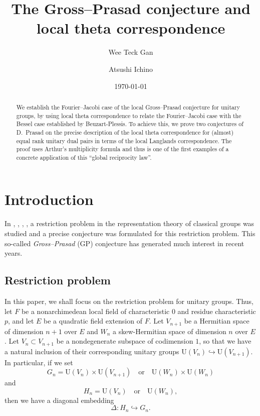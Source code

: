 \documentclass[11pt]{amsart}
\title{The Gross--Prasad conjecture and local theta correspondence}
\author{Wee Teck Gan}
\author{Atsushi Ichino}
\date{\today}
\numberwithin{equation}{section}
\theoremstyle{plain}
\theoremstyle{definition}
\theoremstyle{remark}
\def\U{\mathrm{U}}
\begin{document}
\begin{abstract}
We establish the Fourier--Jacobi case of the local Gross--Prasad conjecture for unitary groups, by using local theta correspondence to relate the Fourier--Jacobi case with the Bessel case established by Beuzart-Plessis.
To achieve this, we prove two conjectures of D.~Prasad on the precise description of the local theta correspondence for (almost) equal rank unitary dual pairs in terms of the local Langlands correspondence.
The proof uses Arthur's multiplicity formula and thus is one of the first examples of a concrete application of this ``global reciprocity law''.
\end{abstract}

\maketitle

\section{\textbf{Introduction}}

In \cite{gp1}, \cite{gp2}, \cite{ggp1}, \cite{ggp2}, a restriction problem in the representation theory of classical groups was studied and a precise conjecture was formulated for this restriction problem.
This so-called \emph{Gross--Prasad} (GP) conjecture has generated much interest in recent years. 

\subsection{Restriction problem}

In this paper, we shall focus on the restriction problem for unitary groups.
Thus, let $F$ be a nonarchimedean local field of characteristic $0$ and residue characteristic $p$, and let $E$ be a quadratic field extension of $F$.
Let $V_{n+1}$ be a Hermitian space of dimension $n+1$ over $E$ and $W_n$ a skew-Hermitian space of dimension $n$ over $E$.
Let $V_n \subset V_{n+1}$  be a nondegenerate subspace of codimension $1$,  so that we have a natural inclusion of their corresponding unitary groups $\U(V_{n}) \hookrightarrow \U(V_{n+1})$. 
In particular, if we set 
\[  G_n =  \U(V_n) \times \U(V_{n+1}) \quad \text{or} \quad \U(W_n) \times \U(W_n) \]
and
\[   H_n = \U(V_n) \quad \text{or} \quad \U(W_n), \]
then we have a diagonal embedding
\[ \Delta:  H_n \hookrightarrow G_n. \]
\end{document}
